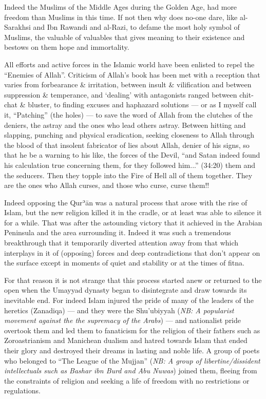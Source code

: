 \documentclass[12pt]{book}
\def \Quran{Qurʾān} %
\def \Qrn{\Quran}   %
\newcommand{\NB}[1]{\emph{NB: #1}}
\begin{document}
Indeed the Muslims of the Middle Ages during the Golden Age, had more freedom
than Muslims in this time. If not then why does no-one dare, like al-Sarakhsi
and Ibn Rawandi and al-Razi, to defame the most holy symbol of Muslims, the
valuable of valuables that gives meaning to their existence and bestows on them
hope and immortality.

All efforts and active forces in the Islamic world have been enlisted to repel
the “Enemies of Allah”. Criticism of Allah’s book has been met with a reception
that varies from forbearance \& irritation, between insult \& vilification and
between suppression \& temperance, and ‘dealing’ with antagonists ranged
between chit-chat \& bluster,
to finding excuses and haphazard solutions — or as
I myself call it, “Patching” (the holes) — to save the word of Allah from the
clutches of the deniers, the astray and the ones who lead others astray.
Between hitting and slapping, punching and physical eradication, seeking
closeness to Allah through the blood of that insolent fabricator of lies about
Allah, denier of his signs, so that he be a warning to his like, the forces of
the Devil, “and Satan indeed found his calculation true concerning them, for
they followed him...” (34:20) them and the seducers. Then they topple into the
Fire of Hell all of them together\footnotemark. They are the ones who Allah
curses, and those who curse, curse them!!


Indeed opposing the \Qrn{} was a natural process that arose with the rise of
Islam, but the new religion killed it in the cradle, or at least was able to
silence it for a while. That was after the astounding victory that it achieved
in the Arabian Peninsula and the area surrounding it. Indeed it was such a
tremendous breakthrough that it temporarily diverted attention away from that
which interplays in it of (opposing) forces and deep contradictions that don’t
appear on the surface except in moments of quiet and stability or at the times
of fitna.

For that reason it is not strange that this process started anew or returned to
the open when the Umayyad dynasty began to disintegrate and draw towards its
inevitable end. For indeed Islam injured the pride of many of the leaders of
the heretics (Zanadiqa) — and they were the Shu’ubiyyah
(\NB{A popularist movement against the the supremacy of the Arabs})
— and nationalist pride overtook them and led them to fanaticism for the
religion of their fathers such as Zoroastrianism and Manichean dualism and
hatred towards Islam that ended their glory and destroyed their dreams in
lasting and noble life. A group of poets who belonged to “The League of the
Mujjan”
(\NB{A group of libertine/dissident intellectuals such as Bashar ibn Burd and
Abu Nuwas})
joined them, fleeing from the constraints of religion
and seeking a life of freedom with no restrictions or regulations.
\end{document}
